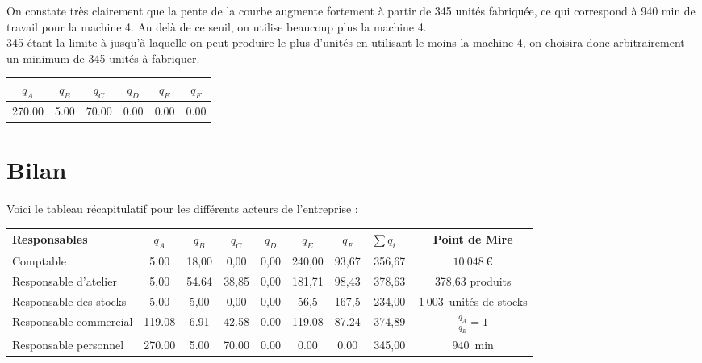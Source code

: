 \documentclass[paper=a4, fontsize=11pt]{scrartcl}
\numberwithin{equation}{section}		%
\numberwithin{figure}{section}			%
\numberwithin{table}{section}				%
\begin{document}
On constate très clairement que la pente de la courbe augmente fortement à partir de 345 unités fabriquée, ce qui correspond à 940 min de travail pour la machine 4. Au delà de ce seuil, on utilise beaucoup plus la machine 4.\\

345 étant la limite à jusqu'à laquelle on peut produire le plus d’unités en utilisant le moins la machine 4, on choisira donc arbitrairement un minimum de 345 unités à fabriquer.

\begin{center}
\begin{tabular}{cccccc}
\hline
$q_A$ & $q_B$ & $q_C$ & $q_D$ & $q_E$ & $q_F$ \\
\hline
270.00 & 5.00 & 70.00 & 0.00 & 0.00 & 0.00 \\
\hline
\end{tabular}
\end{center}


\section{Bilan}

Voici le tableau récapitulatif pour les différents acteurs de l'entreprise :

\begin{center}
\begin{tabular}{l|cccccc|cc}
\hline
Responsables & $q_A$ & $q_B$ & $q_C$ & $q_D$ & $q_E$ & $q_F$ & $\sum q_i \quad$ & Point de Mire \\
\hline
Comptable & 5,00 & 18,00 & 0,00 & 0,00 & 240,00 & 93,67 & 356,67 & $10 \:048\,$€\\
Responsable d'atelier & 5,00 & 54.64 & 38,85 & 0,00 & 181,71 & 98,43 & 378,63 & 378,63 produits\\
Responsable des stocks & 5,00 & 5,00 & 0,00 & 0,00 & 56,5 & 167,5 & 234,00 & $1\:003\,$ unités de stocks\\
Responsable commercial & 119.08 & 6.91 & 42.58 & 0.00 & 119.08 & 87.24 & 374,89 & $\frac{q_A}{q_E}=1$\\
Responsable personnel & 270.00 & 5.00 & 70.00 & 0.00 & 0.00 & 0.00 & 345,00 & $940\,$ min \\

\hline
\end{tabular}
\end{center}
\end{document}
